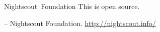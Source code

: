     \newpage
    \thispagestyle{empty}

    \begin{flushleft}\hbox{\Large{Nightscout Foundation}}
    This is open source.

    \vfill
    \copyleft  \the\year -- Nightscout Foundation.
    \url{http://nightscout.info/}

    \end{flushleft}
   \newpage


